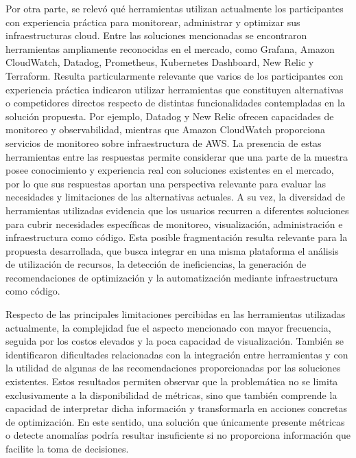 Por otra parte, se relevó qué herramientas utilizan actualmente los
participantes con experiencia práctica para monitorear, administrar y
optimizar sus infraestructuras cloud. Entre las soluciones mencionadas
se encontraron herramientas ampliamente reconocidas en el mercado, como
Grafana, Amazon CloudWatch, Datadog, Prometheus, Kubernetes Dashboard,
New Relic y Terraform. Resulta particularmente relevante que varios de
los participantes con experiencia práctica indicaron utilizar
herramientas que constituyen alternativas o competidores directos
respecto de distintas funcionalidades contempladas en la solución
propuesta. Por ejemplo, Datadog y New Relic ofrecen capacidades de
monitoreo y observabilidad, mientras que Amazon CloudWatch proporciona
servicios de monitoreo sobre infraestructura de AWS. La presencia de
estas herramientas entre las respuestas permite considerar que una parte
de la muestra posee conocimiento y experiencia real con soluciones
existentes en el mercado, por lo que sus respuestas aportan una
perspectiva relevante para evaluar las necesidades y limitaciones de las
alternativas actuales. A su vez, la diversidad de herramientas
utilizadas evidencia que los usuarios recurren a diferentes soluciones
para cubrir necesidades específicas de monitoreo, visualización,
administración e infraestructura como código. Esta posible fragmentación
resulta relevante para la propuesta desarrollada, que busca integrar en
una misma plataforma el análisis de utilización de recursos, la
detección de ineficiencias, la generación de recomendaciones de
optimización y la automatización mediante infraestructura como código.

Respecto de las principales limitaciones percibidas en las herramientas
utilizadas actualmente, la complejidad fue el aspecto mencionado con
mayor frecuencia, seguida por los costos elevados y la poca capacidad de
visualización. También se identificaron dificultades relacionadas con la
integración entre herramientas y con la utilidad de algunas de las
recomendaciones proporcionadas por las soluciones existentes. Estos
resultados permiten observar que la problemática no se limita
exclusivamente a la disponibilidad de métricas, sino que también
comprende la capacidad de interpretar dicha información y transformarla
en acciones concretas de optimización. En este sentido, una solución que
únicamente presente métricas o detecte anomalías podría resultar
insuficiente si no proporciona información que facilite la toma de
decisiones.


